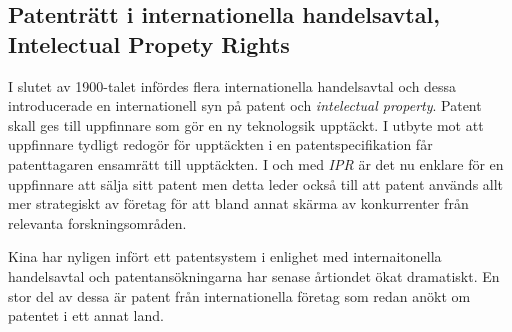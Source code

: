 \subsection{Patenträtt i internationella handelsavtal, Intelectual Propety Rights}

I slutet av 1900-talet infördes flera internationella handelsavtal och dessa introducerade en
internationell syn på patent och \emph{intelectual property}. Patent skall ges till uppfinnare som gör en
ny teknologsik upptäckt. I utbyte mot att uppfinnare tydligt redogör för upptäckten i en
patentspecifikation får patenttagaren ensamrätt till upptäckten. I och med \emph{IPR} är det nu enklare för en uppfinnare att sälja sitt patent men detta leder också till att patent används allt mer strategiskt av företag för att bland annat skärma av konkurrenter från relevanta forskningsområden.

Kina har nyligen infört ett patentsystem i enlighet med internaitonella handelsavtal och patentansökningarna har senase årtiondet ökat dramatiskt. En stor del av dessa är patent från internationella företag som redan anökt om patentet i ett annat land.

%
%
%
